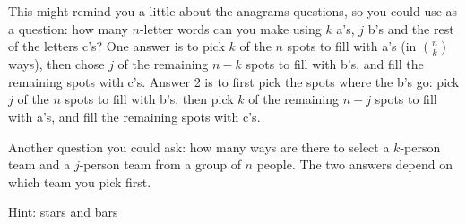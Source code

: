 \protect \documentclass [10pt]{exam}
\renewenvironment{Ans}[1]{\setcounter{question}{#1}\addtocounter{question}{-1}\question }{}
\begin{document}
\begin{questions}
\begin{Ans}{13}
\end{Ans}
\begin{Ans}{14}
  		This might remind you a little about the anagrams questions, so you could use as a question: how many $n$-letter words can you make using $k$ a's, $j$ b's and the rest of the letters c's?  One answer is to pick $k$ of the $n$ spots to fill with a's (in ${n \choose k}$ ways), then chose $j$ of the remaining $n-k$ spots to fill with b's, and fill the remaining spots with c's.  Answer 2 is to first pick the spots where the b's go: pick $j$ of the $n$ spots to fill with b's, then pick $k$ of the remaining $n-j$ spots to fill with a's, and fill the remaining spots with c's.

  		Another question you could ask: how many ways are there to select a $k$-person team and a $j$-person team from a group of $n$ people.  The two answers depend on which team you pick first.
  	
\end{Ans}
\begin{Ans}{15}
  		Hint: stars and bars%
  	
\end{Ans}
\begin{Ans}{16}
\end{Ans}
\end{questions}
\end{document}
